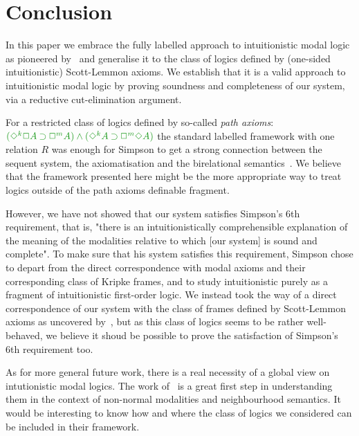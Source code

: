 \section{Conclusion}


In this paper we embrace the fully labelled approach to intuitionistic modal logic as pioneered by~\cite{maffezioli:etal:synthese13} and generalise it to the class of logics defined by (one-sided intuitionistic) Scott-Lemmon axioms.
%
We establish that it is a valid approach to intuitionistic modal logic by proving soundness and completeness of our system, via a reductive cut-elimination argument.

For a restricted class of logics defined by so-called \emph{path axioms}: $\fm{(\DIA^k\BOX A \IMP\BOX^m A) \AND (\DIA^k A \IMP \BOX^m\DIA A)}$ the standard labelled framework with one relation $R$ was enough for Simpson to get a strong connection between the sequent system, the axiomatisation and the birelational semantics~\cite{simpson:phd}.
%
%
We believe that the framework presented here might be the more appropriate way to treat logics outside of the path axioms definable fragment.

However, we have not showed that our system satisfies Simpson's 6th requirement, that is, "there is an intuitionistically comprehensible explanation of the meaning of the modalities relative to which [our system] is sound and complete".
%
To make sure that his system satisfies this requirement, Simpson chose to depart from the direct correspondence with modal axioms and their corresponding class of Kripke frames, and to study intuitionistic purely as a fragment of intuitionistic first-order logic.
%
We instead took the way of a direct correspondence of our system with the class of frames defined by Scott-Lemmon axioms as uncovered by~\cite{plotkin:stirling:86}, but as this class of logics seems to be rather well-behaved, we believe it shoud be possible to prove the satisfaction of Simpson's 6th requirement too.

As for more general future work, there is a real necessity of a global view on intutionistic modal logics.
%
The work of~\cite{dalmonte:grellois:olivetti:arxiv19} is a great first step in understanding them in the context of non-normal modalities and neighbourhood semantics.
%
It would be interesting to know how and where the class of logics we considered can be included in their framework.

